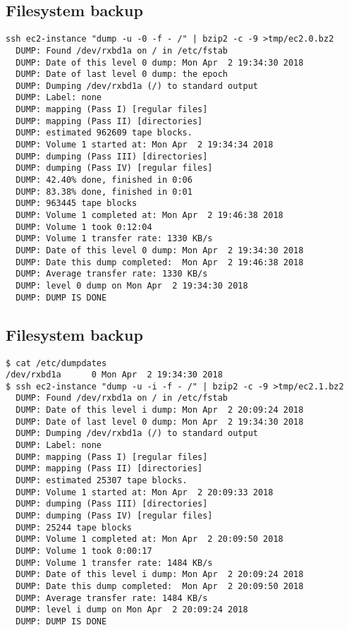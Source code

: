\documentclass[xga]{xdvislides}
\begin{document}
\subsection{Filesystem backup}
\smallish
\begin{verbatim}
ssh ec2-instance "dump -u -0 -f - /" | bzip2 -c -9 >tmp/ec2.0.bz2
  DUMP: Found /dev/rxbd1a on / in /etc/fstab
  DUMP: Date of this level 0 dump: Mon Apr  2 19:34:30 2018
  DUMP: Date of last level 0 dump: the epoch
  DUMP: Dumping /dev/rxbd1a (/) to standard output
  DUMP: Label: none
  DUMP: mapping (Pass I) [regular files]
  DUMP: mapping (Pass II) [directories]
  DUMP: estimated 962609 tape blocks.
  DUMP: Volume 1 started at: Mon Apr  2 19:34:34 2018
  DUMP: dumping (Pass III) [directories]
  DUMP: dumping (Pass IV) [regular files]
  DUMP: 42.40% done, finished in 0:06
  DUMP: 83.38% done, finished in 0:01
  DUMP: 963445 tape blocks
  DUMP: Volume 1 completed at: Mon Apr  2 19:46:38 2018
  DUMP: Volume 1 took 0:12:04
  DUMP: Volume 1 transfer rate: 1330 KB/s
  DUMP: Date of this level 0 dump: Mon Apr  2 19:34:30 2018
  DUMP: Date this dump completed:  Mon Apr  2 19:46:38 2018
  DUMP: Average transfer rate: 1330 KB/s
  DUMP: level 0 dump on Mon Apr  2 19:34:30 2018
  DUMP: DUMP IS DONE
\end{verbatim}
\Normalsize


\subsection{Filesystem backup}
\smallish
\begin{verbatim}
$ cat /etc/dumpdates
/dev/rxbd1a      0 Mon Apr  2 19:34:30 2018
$ ssh ec2-instance "dump -u -i -f - /" | bzip2 -c -9 >tmp/ec2.1.bz2
  DUMP: Found /dev/rxbd1a on / in /etc/fstab
  DUMP: Date of this level i dump: Mon Apr  2 20:09:24 2018
  DUMP: Date of last level 0 dump: Mon Apr  2 19:34:30 2018
  DUMP: Dumping /dev/rxbd1a (/) to standard output
  DUMP: Label: none
  DUMP: mapping (Pass I) [regular files]
  DUMP: mapping (Pass II) [directories]
  DUMP: estimated 25307 tape blocks.
  DUMP: Volume 1 started at: Mon Apr  2 20:09:33 2018
  DUMP: dumping (Pass III) [directories]
  DUMP: dumping (Pass IV) [regular files]
  DUMP: 25244 tape blocks
  DUMP: Volume 1 completed at: Mon Apr  2 20:09:50 2018
  DUMP: Volume 1 took 0:00:17
  DUMP: Volume 1 transfer rate: 1484 KB/s
  DUMP: Date of this level i dump: Mon Apr  2 20:09:24 2018
  DUMP: Date this dump completed:  Mon Apr  2 20:09:50 2018
  DUMP: Average transfer rate: 1484 KB/s
  DUMP: level i dump on Mon Apr  2 20:09:24 2018
  DUMP: DUMP IS DONE
\end{verbatim}
\Normalsize
\end{document}
